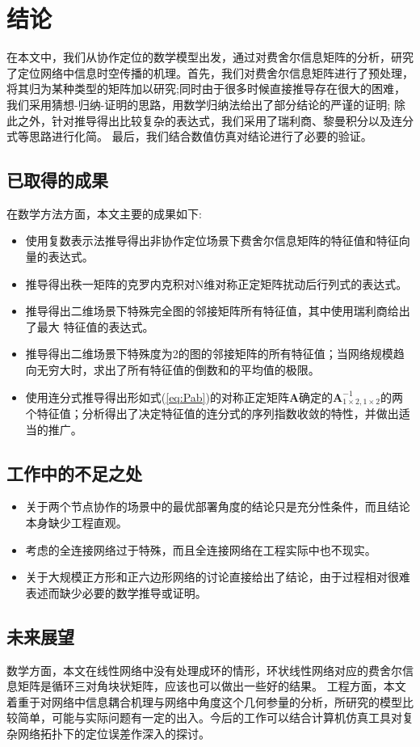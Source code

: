 \chapter{结论}\label{cha:content5}
    在本文中，我们从协作定位的数学模型出发，通过对费舍尔信息矩阵的分析，研究了定位网络中信息时空传播的机理。首先，我们对费舍尔信息矩阵进行了预处理，将其归为某种类型的矩阵加以研究;同时由于很多时候直接推导存在很大的困难，我们采用猜想-归纳-证明的思路，用数学归纳法给出了部分结论的严谨的证明;
    除此之外，针对推导得出比较复杂的表达式，我们采用了瑞利商、黎曼积分以及连分式等思路进行化简。
    最后，我们结合数值仿真对结论进行了必要的验证。
  \section{已取得的成果}
  在数学方法方面，本文主要的成果如下:
  \begin{itemize}
  \item
    使用复数表示法推导得出非协作定位场景下费舍尔信息矩阵的特征值和特征向量的表达式。
  \item
    推导得出秩一矩阵的克罗内克积对N维对称正定矩阵扰动后行列式的表达式。
  \item
    推导得出二维场景下特殊完全图的邻接矩阵所有特征值，其中使用瑞利商给出了最大 特征值的表达式。
  \item 推导得出二维场景下特殊度为2的图的邻接矩阵的所有特征值；当网络规模趋向无穷大时，求出了所有特征值的倒数和的平均值的极限。
  \item 使用连分式推导得出形如式(\ref{eq:Pab})的对称正定矩阵$\bm{A}$确定的$\bm{A}^{-1}_{1\times2,1\times2}$的两个特征值；分析得出了决定特征值的连分式的序列指数收敛的特性，并做出适当的推广。
  \end{itemize}
  \section{工作中的不足之处}
  \begin{itemize}
  \item
  关于两个节点协作的场景中的最优部署角度的结论只是充分性条件，而且结论本身缺少工程直观。
  \item
  考虑的全连接网络过于特殊，而且全连接网络在工程实际中也不现实。
  \item
  关于大规模正方形和正六边形网络的讨论直接给出了结论，由于过程相对很难表述而缺少必要的数学推导或证明。
  \end{itemize}
  \section{未来展望}

  数学方面，本文在线性网络中没有处理成环的情形，环状线性网络对应的费舍尔信息矩阵是循环三对角块状矩阵，应该也可以做出一些好的结果。
  工程方面，本文着重于对网络中信息耦合机理与网络中角度这个几何参量的分析，所研究的模型比较简单，可能与实际问题有一定的出入。今后的工作可以结合计算机仿真工具对复杂网络拓扑下的定位误差作深入的探讨。


